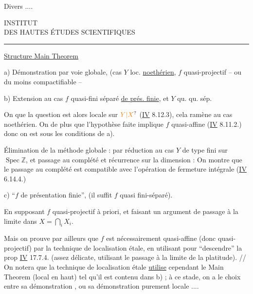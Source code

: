 Divers ....

\begin{center}
INSTITUT\\
DES HAUTES ÉTUDES SCIENTIFIQUES\\
\rule{1.15cm}{0.4pt}
\end{center}

\uline{Structure Main Theorem}

a) Démonstration par voie globale, (cas $Y$ loc. \uline{noethérien}\deleted{\unsure{)|\S{}}}, $f$ quasi-projectif -- ou du moins compactifiable --

b) Extension au cas $f$ quasi-fini séparé \uline{de prés. finie}, et $Y$ qu.  qu. sép.

On  que la question est alors locale sur $\unsure{Y|X}$ (\uline{IV} 8.12.3), cela ramène au cas noethérien. On  de plus que l'hypothèse faite implique $f$ quasi-affine (\uline{IV} 8.11.2.) donc on est sous les conditions de a).

Élimination de la méthode globale : par réduction au cas $Y$  de type fini sur $\operatorname{Spec}\mathbb{Z}$, et passage au complété et récurrence sur la dimension : On montre que le passage au complété est compatible avec l'opération de fermeture intégrale (\uline{IV} 6.14.4.)

c)   ``$f$ de présentation finie'',  (il suffit $f$ quasi fini-séparé).

 En supposant $f$ quasi-projectif à priori, et faisant un argument de passage à la limite dans $X=\bigcap\limits_i X_i$.

 Mais on prouve par ailleurs que $f$ est nécessairement quasi-affine (donc quasi-projectif) par la technique de localisation étale, en utilisant pour ``descendre'' la prop \uline{IV} 17.7.4.  (assez délicate,  utilisant le passage à la limite de la platitude). // On notera que la technique de localisation étale \uline{utilise} cependant le Main Theorem (local en haut) tel qu'il est contenu dans b) ; à ce stade, on a le choix entre sa démonstration  , ou sa démonstration purement locale ....

